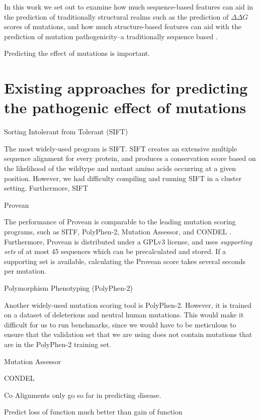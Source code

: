 
In this work we set out to examine how much sequence-based features can aid in the prediction of traditionally structural realms such as the prediction of $\Delta \Delta G$ scores of mutations, and how much structure-based features can aid with the prediction of mutation pathogenicity--a traditionally sequence based .


Predicting the effect of mutations is important. 



\section{Existing approaches for predicting the pathogenic effect of mutations}


Sorting Intolerant from Tolerant (SIFT)

The most widely-used program is SIFT. SIFT creates an extensive multiple sequence alignment for every protein, and produces a conservation score based on the likelihood of the wildtype and mutant amino acids occurring at a given position. However, we had difficulty compiling and running SIFT in a cluster setting. Furthermore, SIFT 


Provean

The performance of Provean is comparable to the leading mutation scoring programs, such as SITF, PolyPhen-2, Mutation Assessor, and CONDEL \cite{choi_predicting_2012}. Furthermore, Provean is distributed under a GPLv3 license, and uses \textit{supporting sets} of at most 45 sequences which can be precalculated and stored. If a supporting set is available, calculating the Provean score takes several seconds per mutation.


Polymorphism Phenotyping (PolyPhen-2)

Another widely-used mutation scoring tool is PolyPhen-2. However, it is trained on a dataset of deleterious and neutral human mutations. This would make it difficult for us to run benchmarks, since we would have to be meticulous to ensure that the validation set that we are using does not contain mutations that are in the PolyPhen-2 training set.


Mutation Assessor


CONDEL

Co
Alignments only go so far in predicting disease.


Predict loss of function much better than gain of function 



